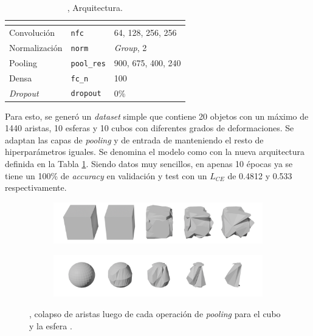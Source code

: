\begin{table}[h]
\centering
\begin{tabular}{|ll|l|}
\hline
\rowcolor[HTML]{FFC702}
\multicolumn{2}{|c|}{\cellcolor[HTML]{FFC702}{Capa}} & \multicolumn{1}{c|}{\cellcolor[HTML]{FFC702}{Cantidad y/o Densidad}} \\ \hline
Convolución & \lstinline!nfc! & 64, 128, 256, 256 \\ \hline
Normalización & \lstinline!norm! & \textit{Group}, 2 \\ \hline
Pooling & \lstinline!pool_res! & 900, 675, 400, 240 \\ \hline
Densa & \lstinline!fc_n! & 100 \\ \hline
\textit{Dropout} & \lstinline!dropout! & 0\% \\ \hline
\end{tabular}
\caption[SphereCubes, Arquitectura]{, Arquitectura.}
\label{table:sphereCubes}
\end{table}


Para esto, se generó un \textit{dataset} simple que contiene 20 objetos con un máximo de 1440 aristas, 10 esferas y 10 cubos con diferentes grados de deformaciones. Se adaptan las capas de \textit{pooling} y de entrada de  manteniendo el resto de hiperparámetros iguales. Se denomina el modelo como  con la nueva arquitectura definida en la Tabla \ref{table:sphereCubes}. Siendo datos muy sencillos, en apenas 10 épocas ya se tiene un 100\% de \textit{accuracy} en validación y test con un $L_{CE}$ de 0.4812 y 0.533 respectivamente.

\begin{figure}[h]
    \begin{subfigure}{\linewidth}
        \centering
        \includegraphics[width=\linewidth]{imagenes/experiments/cube0_passes.png}
    \end{subfigure}
    \begin{subfigure}{\linewidth}
        \centering
        \includegraphics[width=\linewidth]{imagenes/experiments/sphere0_passes.png}
    \end{subfigure}
    \caption[SphereCubes: Colapso de aristas]{, colapso de aristas luego de cada operación de \textit{pooling} para el cubo  y la esfera .}
    \label{fig:sphereCube_passes}
\end{figure}

